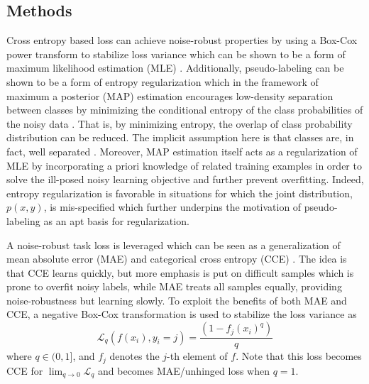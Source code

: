 \documentclass{article}
\begin{document}
\subsection{Methods}
\label{sec:methods}
Cross entropy based loss can achieve noise-robust properties by using a Box-Cox power transform to stabilize loss variance which can be shown to be a form of maximum likelihood estimation (MLE) \cite{ferrari2010}.  Additionally, pseudo-labeling \cite{10.2307/2285824} can be shown to be a form of entropy regularization \cite{Grandvalet2005} which in the framework of maximum a posterior (MAP) estimation encourages low-density separation between classes by minimizing the conditional entropy of the class probabilities of the noisy data \cite{Lee2013}.  That is, by minimizing entropy, the overlap of class probability distribution can be reduced.  The implicit assumption here is that classes are, in fact, well separated \cite{Chapelle2005}.  Moreover, MAP estimation itself acts as a regularization of MLE by incorporating a priori knowledge of related training examples in order to solve the ill-posed noisy learning objective and further prevent overfitting.  Indeed, entropy regularization is favorable in situations for which the joint distribution, $p(x,y)$, is mis-specified \cite{Grandvalet2005} which further underpins the motivation of pseudo-labeling as an apt basis for regularization. 


A noise-robust task loss is leveraged which can be seen as a generalization of mean absolute error (MAE) and categorical cross entropy (CCE) \cite{zhang2018}.  The idea is that CCE learns quickly, but more emphasis is put on difficult samples which is prone to overfit noisy labels, while MAE treats all samples equally, providing noise-robustness but learning slowly.  To exploit the benefits of both MAE and CCE, a negative Box-Cox transformation \cite{10.2307/2984418} is used to stabilize the loss variance as
\begin{equation}
\label{eqn:gce}
\mathcal{L}_q(f(x_i),y_i=j) = \frac{(1-f_j(x_i)^q)}{q} 
\end{equation}  
where $q \in (0,1]$, and $f_j$ denotes the $j$-th element of $f$.  Note that this loss becomes CCE for $\lim_{q \to 0}\mathcal{L}_q$ and becomes MAE/unhinged loss when $q=1$.
\end{document}
